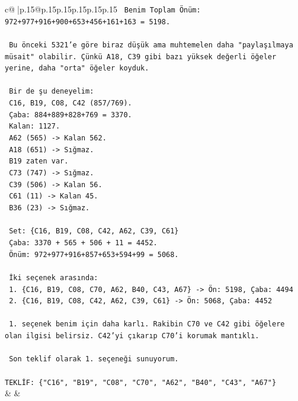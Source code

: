 \documentclass{article}
\begin{document}
{\begin{supertabular}{c@{$\;$}|p{.15\linewidth}@{}p{.15\linewidth}p{.15\linewidth}p{.15\linewidth}p{.15\linewidth}p{.15\linewidth}}
{{{\texttt{   Benim Toplam Önüm: 972+977+916+900+653+456+161+163 = 5198.} \\
\\ 
\texttt{   Bu önceki 5321'e göre biraz düşük ama muhtemelen daha "paylaşılmaya müsait" olabilir. Çünkü A18, C39 gibi bazı yüksek değerli öğeler yerine, daha "orta" öğeler koyduk.} \\
\\ 
\texttt{   Bir de şu deneyelim:} \\
\texttt{   C16, B19, C08, C42 (857/769).} \\
\texttt{   Çaba: 884+889+828+769 = 3370.} \\
\texttt{   Kalan: 1127.} \\
\texttt{   A62 (565) {-}> Kalan 562.} \\
\texttt{   A18 (651) {-}> Sığmaz.} \\
\texttt{   B19 zaten var.} \\
\texttt{   C73 (747) {-}> Sığmaz.} \\
\texttt{   C39 (506) {-}> Kalan 56.} \\
\texttt{   C61 (11) {-}> Kalan 45.} \\
\texttt{   B36 (23) {-}> Sığmaz.} \\
\\ 
\texttt{   Set: \{C16, B19, C08, C42, A62, C39, C61\}} \\
\texttt{   Çaba: 3370 + 565 + 506 + 11 = 4452.} \\
\texttt{   Önüm: 972+977+916+857+653+594+99 = 5068.} \\
\\ 
\texttt{   İki seçenek arasında:} \\
\texttt{   1. \{C16, B19, C08, C70, A62, B40, C43, A67\} {-}> Ön: 5198, Çaba: 4494} \\
\texttt{   2. \{C16, B19, C08, C42, A62, C39, C61\} {-}> Ön: 5068, Çaba: 4452} \\
\\ 
\texttt{   1. seçenek benim için daha karlı. Rakibin C70 ve C42 gibi öğelere olan ilgisi belirsiz. C42'yi çıkarıp C70'i korumak mantıklı.} \\
\\ 
\texttt{   Son teklif olarak 1. seçeneği sunuyorum.} \\
\\ 
\texttt{TEKLİF: \{"C16", "B19", "C08", "C70", "A62", "B40", "C43", "A67"\}} \\
            }
        }
    }
    & & \\ \\


\end{supertabular}}
\end{document}
